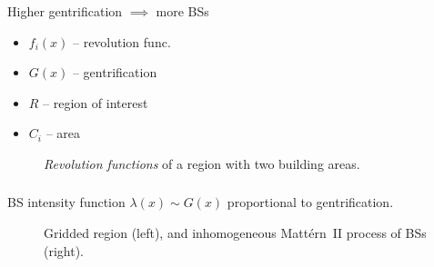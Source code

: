 \documentclass[aspectratio=169]{beamer}
\begin{document}
\begin{frame}
    \frametitle{\secname}
    \framesubtitle{\subsecname}

    Higher gentrification $\implies$ more BSs
    \vfill

    \begin{minipage}{.35\textwidth}
        \begin{itemize}
            \item $f_i(x)$ -- revolution func.
            \item $G(x)$ -- gentrification
            \item $R$ -- region of interest
            \item $C_i$ -- area
        \end{itemize}
    \end{minipage}
    \begin{minipage}{.64\textwidth}
        \begin{figure}
            \centering
            \caption{\emph{Revolution functions} of a region with two building areas.}
            \label{fig:rev}
        \end{figure}
    \end{minipage}

\end{frame}





\begin{frame}
    \frametitle{\secname}
    \framesubtitle{\subsecname}

    BS intensity function $\lambda(x)\sim G(x)$ proportional to gentrification.

    \vfill

    \begin{figure}
        \centering
        
        \caption{Gridded region (left), and inhomogeneous Mattérn~II process of BSs (right).}
        \label{fig:grid-aau-gen}
    \end{figure}
\end{frame}
\end{document}
